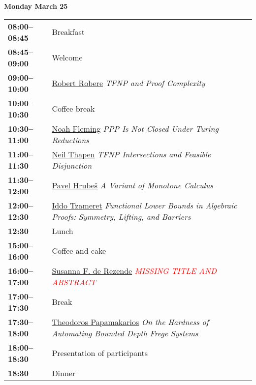 \documentclass[11pt]{article}
\newcommand{\scheduletablewidth}{5.06in}
\begin{document}
\noindent\begin{minipage}{\textwidth}
\begin{center}
{\bf\large Monday March 25}
\end{center}
\begin{tabular}{ p{0.9in} p{\scheduletablewidth} }
{\bf 08:00--08:45}  & Breakfast\\
{\bf 08:45--09:00}  &
                    Welcome
\\

{\bf 09:00--10:00} & \hyperref[Robere]{Robert Robere}
{\em TFNP and Proof Complexity} \\

{\bf 10:00--10:30} & {Coffee break} \\

{\bf 10:30--11:00} & \hyperref[Fleming]{Noah Fleming}
{\em PPP Is Not Closed Under Turing Reductions} \\

{\bf 11:00--11:30} & \hyperref[Thapen]{Neil Thapen}
{\em TFNP Intersections and Feasible Disjunction} \\

{\bf 11:30--12:00} & \hyperref[Hrubes]{Pavel Hrube\v{s}}
{\em A Variant of Monotone Calculus} \\

{\bf 12:00--12:30} & \hyperref[Tzameret]{Iddo Tzameret}
{\em Functional Lower Bounds in Algebraic Proofs: Symmetry, Lifting, and Barriers} \\

{\bf 12:30%
} &  Lunch\\

{\bf 15:00--16:00} &  Coffee and cake \\

{\bf 16:00--17:00} & \hyperref[Rezende]{Susanna F. de Rezende}
{\em \textcolor{red}{MISSING TITLE AND ABSTRACT}} \\

{\bf 17:00--17:30} & {Break} \\

{\bf 17:30--18:00} & \hyperref[Papamakarios]{Theodoros Papamakarios}
{\em On the Hardness of Automating Bounded Depth Frege Systems} \\

{\bf 18:00--18:30} & Presentation of participants \\

{\bf 18:30%
} & Dinner \\
\end{tabular}
\end{minipage}
\end{document}
